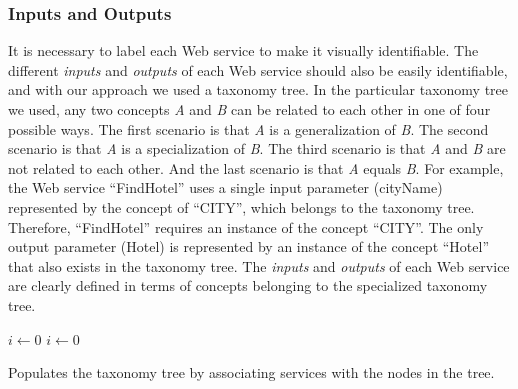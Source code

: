 \subsubsection {Inputs and Outputs}
It is necessary to label each Web service to make it visually identifiable. The different \emph{inputs} and  \emph{outputs} of each Web service should also be easily identifiable, and with our approach we used a taxonomy tree. In the particular taxonomy tree we used, any two concepts \emph{A} and \emph{B} can be related to each other in one of four possible ways. The first scenario is that \emph{A} is a generalization of \emph{B}. The second scenario is that \emph{A} is a specialization of \emph{B}. The third scenario is that \emph{A} and \emph{B} are not related to each other. And the last scenario is that  \emph{A} equals \emph{B}. For example, the Web service \newcommand{\quotes}[1]{``#1''}\quotes{FindHotel} uses a single input parameter (cityName) represented by the concept of \quotes{CITY}, which belongs to the taxonomy tree. Therefore, \quotes{FindHotel} requires an instance of the concept \quotes{CITY}. The only output parameter (Hotel) is represented by an instance of the concept \quotes{Hotel} that also exists in the taxonomy tree. The \emph{inputs} and \emph{outputs} of each Web service are clearly defined in terms of concepts belonging to the specialized taxonomy tree.

\begin{algorithm}[H]

 \LinesNumbered
 \SetNlSty{}{}{:}
 $i \leftarrow 0$\;
  $i \leftarrow 0$\;
 \caption{\footnotesize Populates the taxonomy tree by associating services with the nodes in the tree.}
\label{generation}
\end{algorithm}

